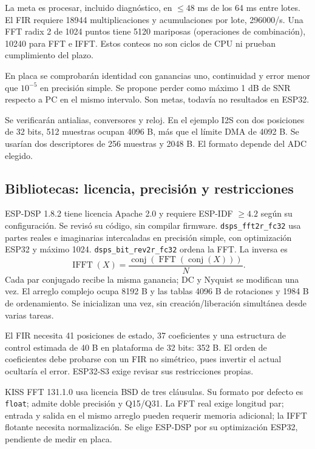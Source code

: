 \documentclass[11pt,a4paper]{article}
\newcommand{\ruta}[1]{\nolinkurl{#1}}
\begin{document}
La meta es procesar, incluido diagnóstico, en $\leq48$ ms de los 64 ms entre lotes. El FIR requiere 18944 multiplicaciones y acumulaciones por lote, 296000/s. Una FFT radix 2 de 1024 puntos tiene 5120 mariposas (operaciones de combinación), 10240 para FFT e IFFT. Estos conteos no son ciclos de CPU ni prueban cumplimiento del plazo.

En placa se comprobarán identidad con ganancias uno, continuidad y error menor que $10^{-5}$ en precisión simple. Se propone perder como máximo 1 dB de SNR respecto a PC en el mismo intervalo. Son metas, todavía no resultados en ESP32.

Se verificarán antialias, conversores y reloj. En el ejemplo I2S con dos posiciones de 32 bits, 512 muestras ocupan 4096 B, más que el límite DMA de 4092 B. Se usarían dos descriptores de 256 muestras y 2048 B\cite{espidf}. El formato depende del ADC elegido.

\subsection{Bibliotecas: licencia, precisión y restricciones}
ESP-DSP 1.8.2 tiene licencia Apache 2.0 y requiere ESP-IDF $\geq4.2$ según su configuración\cite{espdsp}. Se revisó su código, sin compilar firmware. \ruta{dsps_fft2r_fc32} usa partes reales e imaginarias intercaladas en precisión simple, con optimización ESP32 y máximo 1024. \ruta{dsps_bit_rev2r_fc32} ordena la FFT. La inversa es
\begin{equation}\operatorname{IFFT}(X)=\frac{\operatorname{conj}(\operatorname{FFT}(\operatorname{conj}(X)))}N.\end{equation}
Cada par conjugado recibe la misma ganancia; DC y Nyquist se modifican una vez. El arreglo complejo ocupa 8192 B y las tablas 4096 B de rotaciones y 1984 B de ordenamiento. Se inicializan una vez, sin creación/liberación simultánea desde varias tareas.

El FIR necesita 41 posiciones de estado, 37 coeficientes y una estructura de control estimada de 40 B en plataforma de 32 bits: 352 B. El orden de coeficientes debe probarse con un FIR no simétrico, pues invertir el actual ocultaría el error. ESP32-S3 exige revisar sus restricciones propias.

KISS FFT 131.1.0 usa licencia BSD de tres cláusulas\cite{kiss}. Su formato por defecto es \ruta{float}; admite doble precisión y Q15/Q31. La FFT real exige longitud par; entrada y salida en el mismo arreglo pueden requerir memoria adicional; la IFFT flotante necesita normalización. Se elige ESP-DSP por su optimización ESP32, pendiente de medir en placa.
\end{document}

